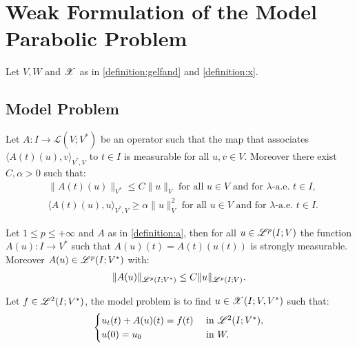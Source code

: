 \newpage
\section{Weak Formulation of the Model Parabolic Problem}

Let $V, W$ and $\mathscr{X}$ as in \ref{definition:gelfand} and \ref{definition:x}.

\subsection{Model Problem}

\begin{definition}[A] \label{definition:a}
    Let $A \colon I \rightarrow \mathcal{L}(V;V^*)$ be an operator such that the map that associates $\langle A(t)(u), v \rangle_{V^*, V}$ to $t \in I$ is measurable for all $u, v \in V$. Moreover there exist $C, \alpha > 0$ such that:
    \begin{align} \label{equation:a}
        & \lVert A(t)(u) \rVert_{V^*} \leq C \lVert u \rVert_V \text{ for all } u \in V \text{ and for } \lambda \text{-a.e. } t \in I, \\
        & \langle A(t)(u), u \rangle_{V^*, V} \geq \alpha \lVert u \rVert_V^2 \text{ for all } u \in V \text{ and for } \lambda \text{-a.e. } t \in I.
    \end{align}
\end{definition}

\begin{lemma}
    Let $1 \leq p \leq +\infty$ and  $A$ as in \ref{definition:a}, then for all $u \in \mathscr{L}^{p}(I; V)$ the function $A(u) \colon I \rightarrow V^*$ such that $A(u)(t) = A(t)(u(t))$ is strongly measurable. Moreover $A(u) \in \mathscr{L}^{p}(I; V^*)$ with:
    \begin{gather}
        \lVert A(u) \rVert_{\mathscr{L}^{p}(I; V^*)} \leq C \lVert u \rVert_{\mathscr{L}^{p}(I; V)}.
    \end{gather}
\end{lemma}

\begin{definition} \label{definition:model}
    Let $f \in \mathscr{L}^{2}(I; V^*)$, the model problem is to find $u \in \mathscr{X}(I; V, V^*)$ such that:
    \begin{gather}
        \begin{cases}
            u_t(t) + A(u)(t) = f(t) & \text{ in } \mathscr{L}^{2}(I; V^*), \\
            u(0) = u_0 & \text{ in } W.
        \end{cases}
    \end{gather}
\end{definition}

